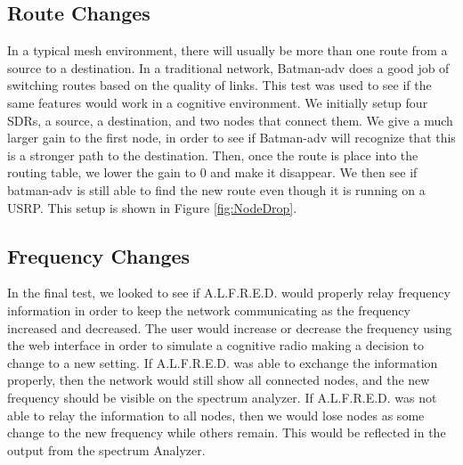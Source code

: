 \subsection{Route Changes}

In a typical mesh environment, there will usually be more than one route from a source to a destination. In a traditional network, Batman-adv does a good job of switching routes based on the quality of links. This test was used to see if the same features would work in a cognitive environment. We initially setup four SDRs, a source, a destination, and two nodes that connect them. We give a much larger gain to the first node, in order to see if Batman-adv will recognize that this is a stronger path to the destination. Then, once the route is place into the routing table, we lower the gain to 0 and make it disappear. We then see if batman-adv is still able to find the new route even though it is running on a USRP. This setup is shown in Figure \ref{fig:NodeDrop}.



\subsection{Frequency Changes}

In the final test, we looked to see if A.L.F.R.E.D. would properly relay frequency information in order to keep the network communicating as the frequency increased and decreased. The user would increase or decrease the frequency using the web interface in order to simulate a cognitive radio making a decision to change to a new setting. If A.L.F.R.E.D. was able to exchange the information properly, then the network would still show all connected nodes, and the new frequency should be visible on the spectrum analyzer. If A.L.F.R.E.D. was not able to relay the information to all nodes, then we would lose nodes as some change to the new frequency while others remain. This would be reflected in the output from the spectrum Analyzer. 